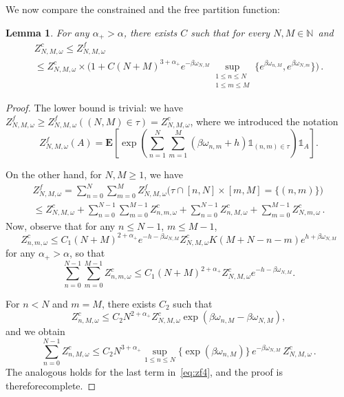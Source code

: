 \documentclass[10pt]{amsart}
\newtheorem{lemm}[theo]{Lemma}\newtheorem{prop}[theo]{Proposition}\newtheorem{coro}[theo]{Corollary}\newtheorem{conj}[theo]{Conjecture}
\theoremstyle{definition}\newtheorem{defi}[theo]{Definition}\newtheorem{rema}[theo]{Remark}\newtheorem{exam}[theo]{Example}\newtheorem{exem}[theo]{Example}\newtheorem{nota}[theo]{Notation}
\newcommand{\ga}{\alpha}
\newcommand{\unbf}%
{\mathds{1}}
\newcommand{\bE}{\ensuremath{\mathbf{E}}}
\newcommand{\bbN}{\ensuremath{\mathbb{N}}}
\newcommand{\suptwo}[2]{\sup_{\substack{#1 \\ #2}}}
\begin{document}
We now compare the constrained and the free partition function:
\begin{lemm}\label{th:zfc}
For any $\ga_+ > \ga$, there exists $C$ such that for every $N,M \in \bbN$~and
\begin{multline}
Z^{c}_{N,M,\omega} \le Z^{f}_{N,M,\omega}\\
\le Z^{c}_{N,M,\omega}
\times \!\biggl(1 + C (N+M)^{3+\ga_+} e^{-\beta \omega_{N,M}} \suptwo{1 \le n \le N}{1 \le m \le M } \lbrace e^{\beta \omega_{n,M} }, e^{ \beta \omega_{N,m} } \rbrace \bigg)\,.
\end{multline}
\end{lemm}

\begin{proof}
The lower bound is trivial: we have $Z_{N,M,\omega}^{f} \geq Z^{f}_{N,M,\omega} ((N,M)\in\tau)=Z_{N,M,\omega}^{c}$, where we introduced the notation 
\[Z^{f}_{N,M,\omega} (A) =
\bE \left[\exp \!\left(\sum_{n=1}^N \sum_{m=1}^M (\beta \omega_{n,m} +h) \unbf_{(n,m) \in \tau} \right) \unbf_A \right].
\]

On the other hand, for $N,M \ge 1$, we have
\begin{multline}
Z^{f}_{N,M,\omega} = \sum_{n=0}^N \sum_{m=0}^{M} Z^{f}_{N,M,\omega} \big(\tau \cap [n,N] \times [m,M] = \lbrace (n,m) \rbrace \big) \\
\leq Z_{N,M,\omega}^c +\sum_{n=0}^{N-1} \sum_{m=0}^{M-1} Z_{n,m,\omega}^{c} + \sum_{n=0}^{N-1} Z_{n,M,\omega}^{c} +\sum_{m=0}^{M-1} Z_{N,m,\omega}^{c}\,.\label{eq:zf4}
\end{multline}
Now, observe that for any $n\leq N-1$, $m\leq M-1$,
\begin{equation}
Z^{c}_{n,m,\omega}
\le C_1 (N+M)^{2+ \ga_+} e^{ -h - \beta \omega_{N,M} } Z^{c}_{N,M,\omega} K (M+N -n-m) e^{ h+\beta \omega_{N,M} }
\end{equation}
for any $\ga_+ > \ga$, so that
\begin{equation}
\sum_{n=0}^{N-1} \sum_{m=0}^{M-1} Z^{c}_{n,m,\omega} \leq C_1 (N+M)^{2+ \ga_+} Z^{c}_{N,M,\omega}e^{-h - \beta \omega_{N,M} }.
\end{equation}

For $n < N$ and $m=M$, there exists $C_2$ such that
\begin{equation}
Z^{c}_{n,M,\omega} \le C_2 N^{2+\ga_+} Z^{c}_{N,M,\omega} \exp \left(\beta \omega_{n,M} - \beta \omega_{N,M} \right),
\end{equation}
and we obtain
\begin{equation}
\sum_{n=0}^{N-1} Z^{c}_{n,M,\omega} \le C_2 N ^{3 +\ga_+ } \sup_{1 \le n \le N} \lbrace \exp(\beta \omega_{n,M}) \rbrace\,e^{-\beta \omega_{N,M}}\,Z^{c}_{N,M,\omega}\,.
\end{equation}
The analogous holds for the last term in~\eqref{eq:zf4}, and the proof is therefore\linebreak complete.
\end{proof}
\end{document}
